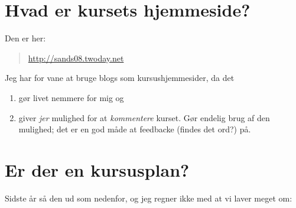 \documentclass[11pt,a4paper,article,oneside]{memoir}
\begin{document}
\section{Hvad er kursets hjemmeside?}

Den er her:
\begin{quote}
  \url{http://sands08.twoday.net}
\end{quote}

\noindent Jeg har for vane at bruge blogs som kursushjemmesider, da det
\begin{enumerate}
\item gør livet nemmere for mig og
\item giver \emph{jer} mulighed for at \emph{kommentere} kurset. Gør
  endelig brug af den mulighed; det er en god måde at feedbacke (findes
  det ord?) på.
\end{enumerate}

\section{Er der en kursusplan?}
Sidste år så den ud som nedenfor, og jeg regner ikke med at vi laver meget
om:
\end{document}
